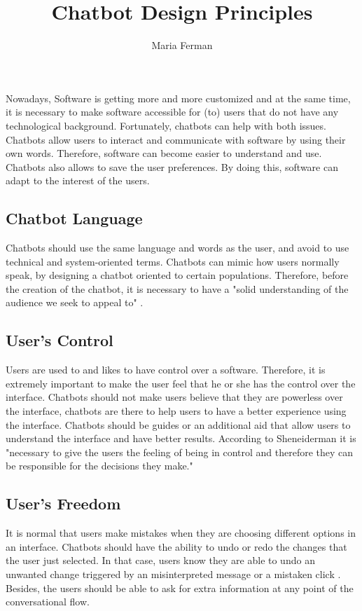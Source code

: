 \documentclass[a4paper,10pt]{article}
\title{Chatbot Design Principles}
\author{Maria Ferman}
\begin{document}
\maketitle

Nowadays, Software is getting more and more customized and at the same time, it is necessary to make software accessible for (to) users that do not have any technological background. Fortunately, chatbots can help with both issues. Chatbots allow users to interact and communicate with software by using their own words. Therefore, software can become easier to understand and use. Chatbots also allows to save the user preferences. By doing this, software can adapt to the interest of the users.   

\subsection*{Chatbot Language}

Chatbots should use the same language and words as the user, and avoid to use technical and system-oriented terms. Chatbots can mimic how users normally speak, by designing a chatbot oriented to certain populations. Therefore, before the creation of the chatbot, it is necessary to have a "solid understanding of the audience we seek to appeal to" \cite{HeuristicsWebPage}.  

\subsection*{User's Control}

Users are used to and likes to have control over a software. Therefore, it is extremely important to make the user feel that he or she has the control over the interface. Chatbots should not make users believe that they are powerless over the interface, chatbots are there to help users to have a better experience using the interface. Chatbots should be guides or an additional aid that allow users to understand the interface and have better results. According to Sheneiderman \cite{shneiderman1997direct} it is "necessary to give the users the feeling of being in control and therefore they can be responsible for the decisions they make."  

\subsection*{User's Freedom}

It is normal that users make mistakes when they are choosing different options in an interface. Chatbots should have the ability to undo or redo the changes that the user just selected. In that case, users know they are able to undo an unwanted change triggered by an misinterpreted message or a mistaken click \cite{HeuristicsWebPage}. Besides, the users should be able to ask for extra information at any point of the conversational flow. 
\end{document}
